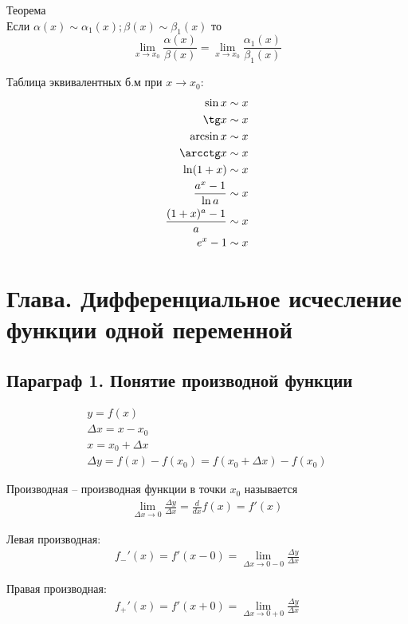 \documentclass[a4paper, 12pt]{article}
\begin{document}
\begin{mdframed}[backgroundcolor=blue!20] 
       Теорема\\
       Если $ \alpha (x)\sim \alpha_1 (x);\beta (x)\sim \beta_1 (x) $ то \[
         \lim_{x\to x_0} \frac{\alpha (x)}{\beta (x)} = \lim_{x\to x_0} \frac{\alpha_1 (x) }{\beta_1 (x)}
       \] 
    \end{mdframed}
    
Таблица эквивалентных б.м при $ x \to x_0 $:
\begin{align}
  \sin x \sim x \\
  \tg x \sim x\\
  \arcsin x \sim x\\
  \arcctg x \sim x\\
  \ln (1+x) \sim x\\
  \frac{a^x - 1}{\ln a} \sim x\\
  \frac{(1+x)^a - 1}{a} \sim x\\
  e^x -1 \sim x
\end{align}

\section{Глава. Дифференциальное исчесление функции одной переменной}
\subsection{Параграф 1. Понятие производной функции}
\begin{align*}
  y = f(x)\\
  \Delta x = x - x_0 \\
  x = x_0 + \Delta x\\
  \Delta y = f(x) - f(x_0) = f(x_0 + \Delta x) - f(x_0)
\end{align*}

Производная -- производная функции в точки $ x_0 $  называется 
\begin{align}
  \lim_{\Delta x\to 0} \frac{\Delta y}{\Delta x} = \frac{d}{dx} f(x) = f'(x)
\end{align}

Левая производная:
\begin{align}
  f_{-}'(x) = f'(x - 0) = \lim_{\Delta x\to 0-0} \frac{\Delta y}{\Delta x} 
\end{align}

Правая производная:
\begin{align}
  f_{+}'(x) = f'(x + 0) = \lim_{\Delta x\to 0+0} \frac{\Delta y}{\Delta x} 
\end{align}
\end{document}
